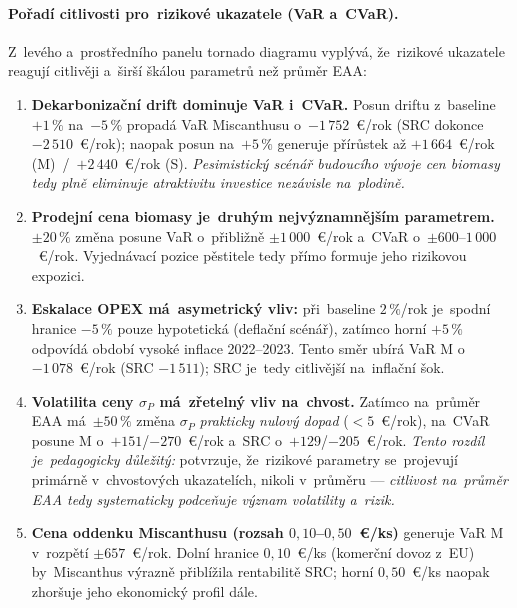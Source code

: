 \paragraph{Pořadí citlivosti pro~rizikové ukazatele (VaR a~CVaR).}
Z~levého a~prostředního panelu tornado diagramu vyplývá, že~rizikové
ukazatele reagují citlivěji a~širší škálou parametrů než průměr EAA:
\begin{enumerate}
    \item \textbf{Dekarbonizační drift dominuje VaR i~CVaR.} Posun driftu
          z~baseline $+1\,\%$ na~$-5\,\%$ propadá VaR Miscanthusu o~$-1\,752$~€/rok
          (SRC dokonce $-2\,510$~€/rok); naopak posun na~$+5\,\%$ generuje
          přírůstek až $+1\,664$~€/rok (M)~/~$+2\,440$~€/rok (S). \emph{Pesimistický
          scénář budoucího vývoje cen biomasy tedy plně eliminuje atraktivitu
          investice nezávisle na~plodině.}
    \item \textbf{Prodejní cena biomasy je~druhým nejvýznamnějším parametrem.}
          $\pm 20\,\%$ změna posune VaR o~přibližně $\pm 1\,000$~€/rok
          a~CVaR o~$\pm 600$--$1\,000$~€/rok. Vyjednávací pozice pěstitele
          tedy přímo formuje jeho rizikovou expozici.
    \item \textbf{Eskalace OPEX má~asymetrický vliv:} při~baseline
          $2\,\%$/rok je~spodní hranice $-5\,\%$ pouze hypotetická
          (deflační scénář), zatímco horní $+5\,\%$ odpovídá období
          vysoké inflace 2022--2023. Tento směr ubírá VaR M o~$-1\,078$~€/rok
          (SRC $-1\,511$); SRC je~tedy citlivější na~inflační šok.
    \item \textbf{Volatilita ceny $\sigma_P$ má~zřetelný vliv na~chvost.}
          Zatímco na~průměr EAA má~$\pm 50\,\%$ změna $\sigma_P$
          \emph{prakticky nulový dopad} ($< 5$~€/rok), na~CVaR posune
          M o~$+151$/$-270$~€/rok a~SRC o~$+129$/$-205$~€/rok. \emph{Tento
          rozdíl je~pedagogicky důležitý:} potvrzuje, že~rizikové parametry
          se~projevují primárně v~chvostových ukazatelích, nikoli v~průměru
          --- \emph{citlivost na~průměr EAA tedy systematicky podceňuje
          význam volatility a~rizik.}
    \item \textbf{Cena oddenku Miscanthusu (rozsah $0{,}10$--$0{,}50$~€/ks)}
          generuje VaR M v~rozpětí $\pm 657$~€/rok. Dolní hranice
          $0{,}10$~€/ks (komerční dovoz z~EU) by~Miscanthus výrazně přiblížila
          rentabilitě SRC; horní $0{,}50$~€/ks naopak zhoršuje jeho
          ekonomický profil dále.
\end{enumerate}


